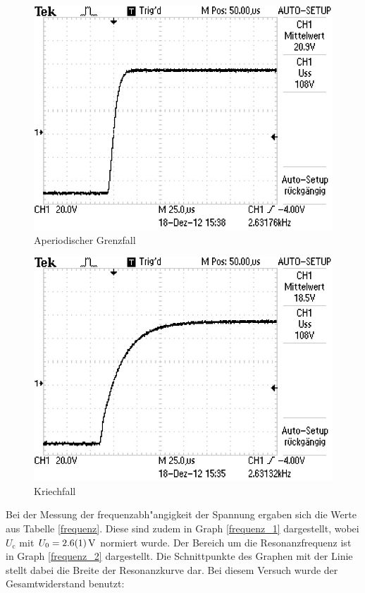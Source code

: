 		\begin{figure}[htbp]
			\centering
			\includegraphics[width = 12cm]{img/F0002TEK.jpg}
			\caption{Aperiodischer Grenzfall}
			\label{ap_2}
		\end{figure}

	\begin{figure}[htbp]
		\centering
		\includegraphics[width = 12cm]{img/F0001TEK.jpg}
		\caption{Kriechfall}
		\label{ap_3}
	\end{figure}

	Bei der Messung der frequenzabh"angigkeit der Spannung ergaben sich die Werte aus Tabelle \eqref{frequenz}.
	Diese sind zudem in Graph \eqref{frequenz_1} dargestellt, wobei $U_\mathrm{c}$ mit $U_\mathrm{0} = \SI{2.6 (1)}{\volt}$ normiert wurde.
	Der Bereich um die Resonanzfrequenz ist in Graph \eqref{frequenz_2} dargestellt. Die Schnittpunkte des Graphen mit der Linie stellt dabei die Breite der Resonanzkurve dar.
	Bei diesem Versuch wurde der Gesamtwiderstand benutzt:

